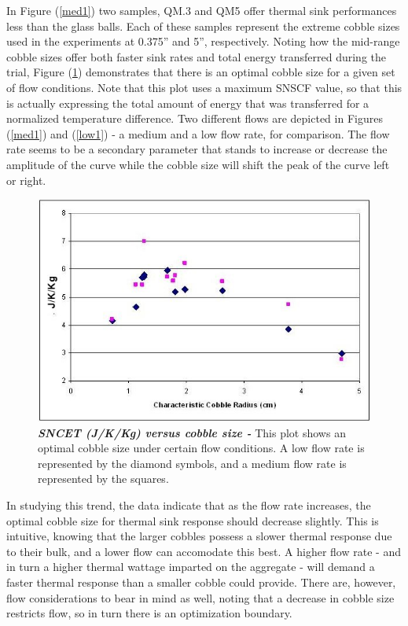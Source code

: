 In Figure (\ref{med1}) two samples, QM.3 and QM5 offer thermal sink performances less than the glass balls. Each of these samples represent the extreme cobble sizes used in the experiments at 0.375'' and 5'', respectively. Noting how the mid-range cobble sizes offer both faster sink rates and total energy transferred during the trial, Figure (\ref{opt1}) demonstrates that there is an optimal cobble size for a given set of flow conditions. Note that this plot uses a maximum SNSCF value, so that this is actually expressing the total amount of energy that was transferred for a normalized temperature difference. Two different flows are depicted in Figures (\ref{med1}) and (\ref{low1}) - a medium and a low flow rate, for comparison. The flow rate seems to be a secondary parameter that stands to increase or decrease the amplitude of the curve while the cobble size will shift the peak of the curve left or right. 

\begin{figure}[h!]
\centering\includegraphics[scale=0.6]{opt2.JPG}
\caption[Scaled, Normalized CET vs Cobble Size]{\textbf{\emph{SNCET (J/K/Kg) versus cobble size - }} This plot shows an optimal cobble size under certain flow conditions. A low flow rate is represented by the diamond symbols, and a medium flow rate is represented by the squares.\label{opt1}}
\end{figure}

In studying this trend, the data indicate that as the flow rate increases, the optimal cobble size for thermal sink response should decrease slightly. This is intuitive, knowing that the larger cobbles possess a slower thermal response due to their bulk, and a lower flow can accomodate this best. A higher flow rate - and in turn a higher thermal wattage imparted on the aggregate -  will demand a faster thermal response than a smaller cobble could provide. There are, however, flow considerations to bear in mind as well, noting that a decrease in cobble size restricts flow, so in turn there is an optimization boundary. 

